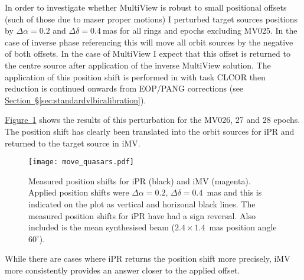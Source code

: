 	In order to investigate whether MultiView is robust to small positional offsets (such of those due to maser proper motions) I perturbed target sources positions by $\Delta\alpha=0.2$ and $\Delta\delta=0.4~$mas for all rings and epochs excluding MV025. In the case of inverse phase referencing this will move all orbit sources by the negative of both offsets. In the case of MultiView I expect that this offset is returned to the centre source after application of the inverse MultiView solution. The application of this position shift is performed in \aips\space with task CLCOR then reduction is continued onwards from EOP/PANG corrections (see \hyperref[sec:standardvlbicalibration]{Section~\S\ref*{sec:standardvlbicalibration}}).
		
	\hyperref[fig:offsetquasars]{Figure~\ref*{fig:offsetquasars}} shows the results of this perturbation for the MV026, 27 and 28 epochs. The position shift has clearly been translated into the orbit sources for iPR and returned to the target source in iMV. 
	\begin{figure}[h]
		\centering
		\texttt{[image: move\_quasars.pdf]}
		\caption[Offset quasars]{Measured position shifts for iPR (black) and iMV (magenta). Applied position shifts were $\Delta\alpha=0.2$, $\Delta\delta=0.4$~mas and this is indicated on the plot as vertical and horizonal black lines. The measured position shifts for iPR have had a sign reversal. Also included is the mean synthesised beam ($2.4\times1.4$~mas position angle $60^\circ$).} \label{fig:offsetquasars}
	\end{figure}
	While there are cases where iPR returns the position shift more precisely, iMV more consistently provides an answer closer to the applied offset. %
	
